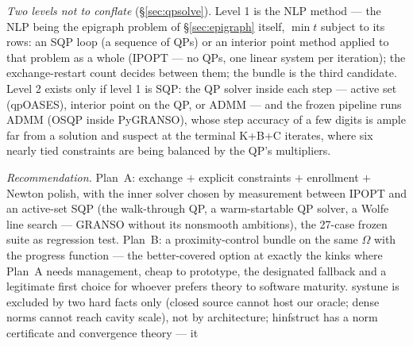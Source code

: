 \documentclass[11pt,a4paper]{article}
\newcommand{\rev}[1]{#1}
\newcommand{\revb}[1]{#1}
\begin{document}
\rev{\emph{Two levels not to conflate} (\S\ref{sec:qpsolve}).  Level 1 is the NLP method \revb{--- the NLP being the epigraph problem of
\S\ref{sec:epigraph} itself, $\min t$ subject to its rows}: an SQP loop (a sequence of
QPs) or an interior point method applied to that problem as a whole (IPOPT --- no QPs,
one linear system per iteration); the exchange-restart count
decides between them; the bundle is the third candidate.  Level 2 exists only if level 1
is SQP: the QP solver inside each step --- active set (qpOASES), interior point on the
QP, or ADMM --- and the frozen pipeline runs ADMM (OSQP inside PyGRANSO), whose step
accuracy of a few digits is ample far from a solution and suspect at the terminal K+B+C
iterates, where six nearly tied constraints are being balanced by the QP's multipliers.}

\emph{Recommendation.}  Plan~A: exchange $+$ explicit constraints $+$ enrollment $+$
Newton polish, with the inner solver chosen by measurement between IPOPT and an
active-set SQP (the walk-through QP, a warm-startable QP solver, a Wolfe line search
--- GRANSO without its nonsmooth ambitions), the 27-case frozen suite as regression
test.  Plan~B: a proximity-control bundle on the same $\Omega$ with the progress function
--- the better-covered option at exactly the kinks where Plan~A needs management, cheap
to prototype, the designated fallback and a legitimate first choice for whoever prefers
theory to software maturity.  \textsf{systune} is excluded by two hard facts only
(closed source cannot host our oracle; dense norms cannot reach cavity scale), not by
architecture; \textsf{hinfstruct} has a norm certificate and convergence theory --- it
\end{document}
